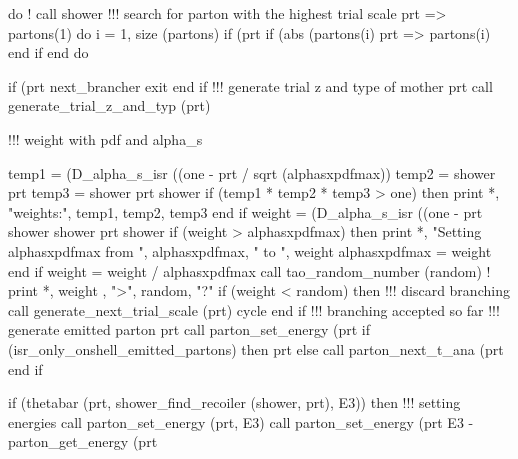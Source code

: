     do
       ! call shower%
       !!! search for parton with the highest trial scale
       prt => partons(1)%
       do i = 1, size (partons)
          if (prt%
          if (abs (partons(i)%
             prt => partons(i)%
          end if
       end do

       if (prt%
          next_brancher%
          exit
       end if
       !!! generate trial z and type of mother prt
       call generate_trial_z_and_typ (prt)

       !!! weight with pdf and alpha_s

       temp1 = (D_alpha_s_isr ((one - prt%
            / sqrt (alphasxpdfmax))
       temp2 = shower%
            prt%
       temp3 = shower%
            prt%
            shower%
       if (temp1 * temp2 * temp3 > one) then
          print *, "weights:", temp1, temp2, temp3
       end if
       weight = (D_alpha_s_isr ((one - prt%
            shower%
            shower%
            prt%
            shower%
       if (weight > alphasxpdfmax) then
          print *, "Setting alphasxpdfmax from ", alphasxpdfmax, " to ", weight
          alphasxpdfmax = weight
       end if
       weight = weight / alphasxpdfmax
       call tao_random_number (random)
       ! print *, weight , ">", random, "?"
       if (weight < random) then
          !!! discard branching
          call generate_next_trial_scale (prt)
          cycle
       end if
       !!! branching accepted so far
       !!! generate emitted parton
       prt%
       call parton_set_energy (prt%
       if (isr_only_onshell_emitted_partons) then
          prt%
       else
          call parton_next_t_ana (prt%
       end if

       if (thetabar (prt, shower_find_recoiler (shower, prt), E3)) then
          !!! setting energies
          call parton_set_energy (prt, E3)
          call parton_set_energy (prt%
               E3 - parton_get_energy (prt%

